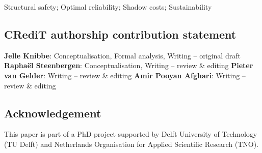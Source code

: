\documentclass[]{interact}
\theoremstyle{plain}%
\theoremstyle{definition}
\theoremstyle{remark}
\begin{document}
\begin{keywords}
Structural safety; Optimal reliability; Shadow costs; Sustainability


\end{keywords}

\linenumbers










\subsection*{CRediT authorship contribution statement}

\textbf{Jelle Knibbe}: Conceptualisation, Formal analysis, Writing – original draft
\textbf{Raphaël Steenbergen}: Conceptualisation, Writing – review \& editing
\textbf{Pieter van Gelder}: Writing – review \& editing
\textbf{Amir Pooyan Afghari}: Writing – review \& editing

\subsection*{Acknowledgement}
This paper is part of a PhD project supported by Delft University of Technology (TU Delft) and Netherlands Organisation for Applied Scientific Research (TNO).



\appendix




\end{document}
